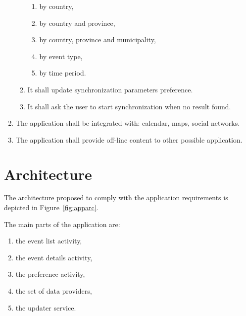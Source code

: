 \documentclass[12pt, twoside]{article}
\begin{document}
\begin{enumerate}
\begin{enumerate}
			\begin{enumerate}
				\item by country,
				\item	by country and province,
				\item	by country, province and municipality,
				\item by event type,
				\item by time period.
			\end{enumerate}
			\item It shall update synchronization parameters preference.
			\item	It shall ask the user to start synchronization when no result found.
    		\end{enumerate}
    	\item The application shall be integrated with: calendar, maps, social networks.
    	\item The application shall provide off-line content to other possible application.
\end{enumerate}

\section{Architecture}

The architecture proposed to comply with the application requirements
is depicted in Figure~\ref{fig:apparc}. 

The main parts of the application are:
\begin{enumerate}
	\item	the event list activity,
	\item	the event details activity,
	\item	the preference activity,
	\item	the set of data providers,
	\item	the updater service.
\end{enumerate}
\end{document}
